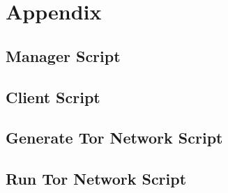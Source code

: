 \documentclass{ecuthesis}
\begin{document}
\chapter{Appendix}

\section{Manager Script}

\label{manager-script}


\section{Client Script}

\label{client-script}


\section{Generate Tor Network Script}

\label{generate-tor-network-script}


\section{Run Tor Network Script}

\label{run-tor-network-script}


\printbibliography[title=REFERENCES]
\end{document}
